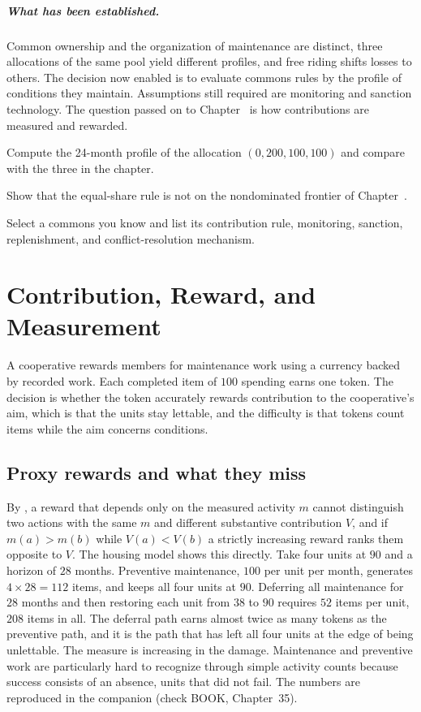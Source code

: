 \paragraph{What has been established.} Common ownership and the organization of maintenance are distinct, three allocations of the same pool yield different profiles, and free riding shifts losses to others. The decision now enabled is to evaluate commons rules by the profile of conditions they maintain. Assumptions still required are monitoring and sanction technology. The question passed on to Chapter~ is how contributions are measured and rewarded.

\begin{exercise}
Compute the 24-month profile of the allocation $(0,200,100,100)$ and compare with the three in the chapter.
\end{exercise}
\begin{exercise}
Show that the equal-share rule is not on the nondominated frontier of Chapter~.
\end{exercise}
\begin{exercise}
Select a commons you know and list its contribution rule, monitoring, sanction, replenishment, and conflict-resolution mechanism.
\end{exercise}

\chapter{Contribution, Reward, and Measurement}\label{ch:35}

A cooperative rewards members for maintenance work using a currency backed by recorded work. Each completed item of $100$ spending earns one token. The decision is whether the token accurately rewards contribution to the cooperative's aim, which is that the units stay lettable, and the difficulty is that tokens count items while the aim concerns conditions.

\section{Proxy rewards and what they miss}

By , a reward that depends only on the measured activity $m$ cannot distinguish two actions with the same $m$ and different substantive contribution $V$, and if $m(a)>m(b)$ while $V(a)<V(b)$ a strictly increasing reward ranks them opposite to $V$. The housing model shows this directly. Take four units at $90$ and a horizon of $28$ months. Preventive maintenance, $100$ per unit per month, generates $4\times 28=112$ items, and keeps all four units at $90$. Deferring all maintenance for $28$ months and then restoring each unit from $38$ to $90$ requires $52$ items per unit, $208$ items in all. The deferral path earns almost twice as many tokens as the preventive path, and it is the path that has left all four units at the edge of being unlettable. The measure is increasing in the damage. Maintenance and preventive work are particularly hard to recognize through simple activity counts because success consists of an absence, units that did not fail. The numbers are reproduced in the companion (check BOOK, Chapter~35).


